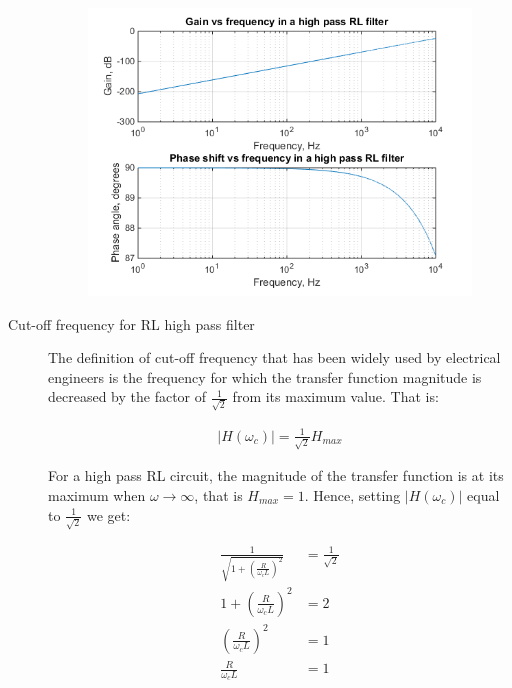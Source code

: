 \documentclass{article}
\begin{document}
\begin{description}
\begin{center}
	\begin{figure}[H]
		\begin{minipage}{0.6\textwidth}
			\includegraphics[scale=0.8]{bode2}
		\end{minipage}
	\end{figure}
\end{center}

\item[Cut-off frequency for RL high pass filter]
The definition of cut-off frequency that has been widely used by electrical engineers is the frequency for which the transfer function magnitude is decreased by the factor of $\frac{1}{\sqrt{2}}$ from its maximum value. That is:

\begin{align*}
|H(\omega_c)| = \frac{1}{\sqrt{2}}H_{max}
\end{align*}

For a high pass RL circuit, the magnitude of the transfer function is at its maximum when $\omega \rightarrow \infty$, that is $H_{max} = 1$. Hence, setting $|H(\omega_c)|$ equal to $\frac{1}{\sqrt{2}}$ we get:

\begin{align*}
\frac{1}{\sqrt{1 + (\frac{R}{\omega_c L})^2}} &= \frac{1}{\sqrt{2}} \\
1 + (\frac{R}{\omega_c L})^2 &= 2 \\
(\frac{R}{\omega_c L})^2 &= 1 \\
\frac{R}{\omega_c L} &= 1
\end{align*}


\end{description}
\end{document}
